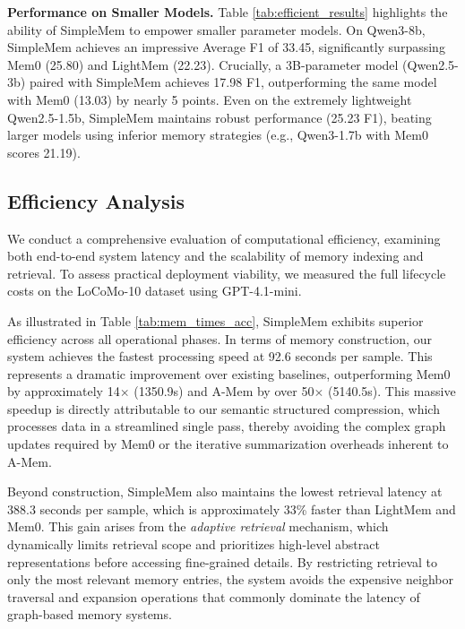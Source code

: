 \documentclass{article}
\newcommand{\ours}{SimpleMem}
\theoremstyle{plain}
\theoremstyle{definition}
\theoremstyle{remark}
\begin{document}
\noindent \textbf{Performance on Smaller Models.}
Table \ref{tab:efficient_results} highlights the ability of \ours{} to empower smaller parameter models.
On Qwen3-8b, \ours{} achieves an impressive Average F1 of 33.45, significantly surpassing Mem0 (25.80) and LightMem (22.23). 
Crucially, a 3B-parameter model (Qwen2.5-3b) paired with \ours{} achieves 17.98 F1, outperforming the same model with Mem0 (13.03) by nearly 5 points.
Even on the extremely lightweight Qwen2.5-1.5b, \ours{} maintains robust performance (25.23 F1), beating larger models using inferior memory strategies (e.g., Qwen3-1.7b with Mem0 scores 21.19). 



\vspace{-0.3em}
\subsection{Efficiency Analysis}
\vspace{-0.3em}
\label{sec:efficiency}
We conduct a comprehensive evaluation of computational efficiency, examining both end-to-end system latency and the scalability of memory indexing and retrieval. To assess practical deployment viability, we measured the full lifecycle costs on the LoCoMo-10 dataset using GPT-4.1-mini.

As illustrated in Table \ref{tab:mem_times_acc}, \ours{} exhibits superior efficiency across all operational phases. In terms of memory construction, our system achieves the fastest processing speed at 92.6 seconds per sample. This represents a dramatic improvement over existing baselines, outperforming Mem0 by approximately 14$\times$ (1350.9s) and A-Mem by over 50$\times$ (5140.5s). This massive speedup is directly attributable to our semantic structured compression, which processes data in a streamlined single pass, thereby avoiding the complex graph updates required by Mem0 or the iterative summarization overheads inherent to A-Mem.

Beyond construction, \ours{} also maintains the lowest retrieval latency at 388.3 seconds per sample, which is approximately 33\% faster than LightMem and Mem0. This gain arises from the \emph{adaptive retrieval} mechanism, which dynamically limits retrieval scope and prioritizes high-level abstract representations before accessing fine-grained details. By restricting retrieval to only the most relevant memory entries, the system avoids the expensive neighbor traversal and expansion operations that commonly dominate the latency of graph-based memory systems.
\end{document}
